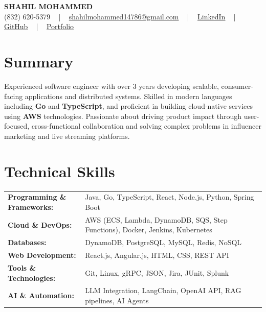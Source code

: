 \documentclass[letterpaper,11pt]{article}
\begin{document}
\begin{center}
    {\fontsize{14pt}{12pt}\selectfont \textbf{\MakeUppercase{Shahil Mohammed}}}\\ \vspace{2pt}
    \fontsize{10pt}{12pt}\selectfont (832) 620-5379 ~ | ~ \href{mailto:shahilmohammed14786@gmail.com}{shahilmohammed14786@gmail.com} ~ | ~  
    \href{https://www.linkedin.com/in/shahil-mohammed-9652931a1/}{\color{blue}\underline{LinkedIn}}  ~ | ~ 
    \href{https://github.com/freakbeast14}{\color{blue}\underline{GitHub}} ~ | ~ 
    \href{https://shahil-mohammed.netlify.app/}{\color{blue}\underline{Portfolio}}
    \vspace{-8pt}
\end{center}

\section{Summary}
\fontsize{9pt}{10pt}\selectfont
Experienced software engineer with over 3 years developing scalable, consumer-facing applications and distributed systems. Skilled in modern languages including \textbf{Go} and \textbf{TypeScript}, and proficient in building cloud-native services using \textbf{AWS} technologies. Passionate about driving product impact through user-focused, cross-functional collaboration and solving complex problems in influencer marketing and live streaming platforms.
 \vspace{-5pt}
 
\section{Technical Skills}
        \vspace{-14pt}
        \begin{table}[h]
            \fontsize{9pt}{10pt}\selectfont
            \begin{tabular}{p{0.3\linewidth} p{0.7\linewidth}}
                \textbf{Programming \& Frameworks:} & Java, Go, TypeScript, React, Node.js, Python, Spring Boot \\
                \textbf{Cloud \& DevOps:} & AWS (ECS, Lambda, DynamoDB, SQS, Step Functions), Docker, Jenkins, Kubernetes \\
                \textbf{Databases:} & DynamoDB, PostgreSQL, MySQL, Redis, NoSQL \\
                \textbf{Web Development:} & React.js, Angular.js, HTML, CSS, REST API \\
                \textbf{Tools \& Technologies:} & Git, Linux, gRPC, JSON, Jira, JUnit, Splunk \\
                \textbf{AI \& Automation:} & LLM Integration, LangChain, OpenAI API, RAG pipelines, AI Agents \\
            \end{tabular}
        \end{table}
 \vspace{-15pt}
 
\end{document}
